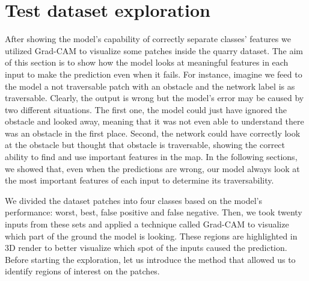 % 
\section{Test dataset exploration}
\label{sec: quarry-dataset}
After showing the model's capability of correctly separate classes' features we utilized Grad-CAM to visualize some patches inside the quarry dataset. The aim of this section is to show how the model looks at meaningful features in each input to make the prediction even when it fails. For instance, imagine we feed to the model a not traversable patch with an obstacle and the network label is as traversable. Clearly, the output is wrong but the model's error may be caused by two different situations. The first one, the model could just have ignored the obstacle and looked away, meaning that it was not even able to understand there was an obstacle in the first place. Second, the network could have correctly look at the obstacle but thought that obstacle is traversable, showing the correct ability to find and use important features in the map. In the following sections, we showed that, even when the predictions are wrong, our model always look at the most important features of each input to determine its traversability. 

We divided the dataset patches into four classes based on the model's performance: worst, best, false positive and false negative. Then, we took twenty inputs from these sets and applied a technique called Grad-CAM to visualize which part of the ground the model is looking. These regions are highlighted in 3D render to better visualize which spot of the inputs caused the prediction. Before starting the exploration, let us introduce the method that allowed us to identify regions of interest on the patches. 
